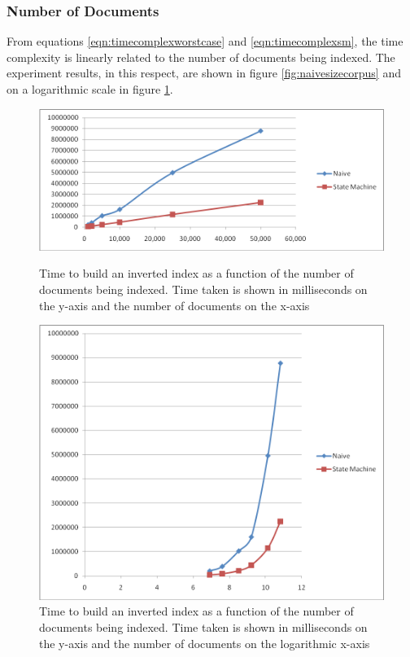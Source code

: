 \documentclass[10pt]{article}
\begin{document}
\subsubsection{Number of Documents}
From equations \ref{eqn:timecomplexworstcase} and
\ref{eqn:timecomplexsm}, the time complexity is linearly related to
the number of documents being indexed. The experiment results, in this
respect, are shown in figure \ref{fig:naivesizecorpus} and on a
logarithmic scale in figure \ref{fig:naivesizecorpuslog}.

\begin{figure}[ht]
  \begin{minipage}[b]{0.5\linewidth}
    \centering
    \includegraphics[width=\textwidth]{naivesizecorpus}
    \caption{Time to build an inverted index as a function of the
      number of documents being indexed. Time taken is shown in
      milliseconds on the y-axis and the number of documents on the
      x-axis} 
    \label{fig:naivesizecorpus}
  \end{minipage}
  \hspace{0.5cm}
  \begin{minipage}[b]{0.5\linewidth}
    \centering
    \includegraphics[width=\textwidth]{naivesizecorpuslog}
    \caption{Time to build an inverted index as a function of the
    number of documents being indexed. Time taken is shown in
      milliseconds on the y-axis and the number of documents on the
      logarithmic x-axis} 
  \label{fig:naivesizecorpuslog}
  \end{minipage}
\end{figure}
\end{document}
